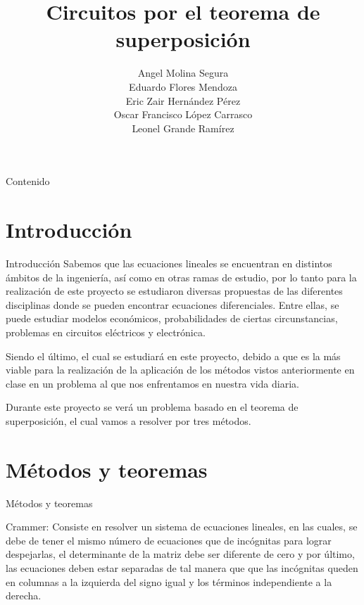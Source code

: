\documentclass[11pt]{beamer}
\author{Angel Molina Segura\\Eduardo Flores Mendoza\\ Eric Zair Hernández Pérez\\ Oscar Francisco López Carrasco\\ Leonel Grande Ramírez}
\title{Circuitos por el teorema de superposición}
\institute{
Tecnológico de Monterrey\\
Campus Puebla\\
Materia: Métodos numéricos
}
\begin{document}
    \begin{frame}
         \maketitle
    \end{frame}
    
    \begin{frame}{Contenido}
    \tableofcontents
    \end{frame}
   
    \section{Introducción}
      \begin{frame}{Introducción}
      \justifying
      Sabemos que las ecuaciones lineales se encuentran en distintos ámbitos de la ingeniería, así como en otras ramas de estudio, por lo tanto para la realización de este proyecto se estudiaron diversas propuestas de las diferentes disciplinas donde se pueden encontrar ecuaciones diferenciales. Entre ellas, se puede estudiar modelos económicos, probabilidades de ciertas circunstancias, problemas en circuitos eléctricos y electrónica.

Siendo el último, el cual se estudiará en este proyecto, debido a que es la más viable para la realización de la aplicación de los métodos vistos anteriormente en clase en un problema al que nos enfrentamos en nuestra vida diaria.

Durante este proyecto se verá un problema basado en el teorema de superposición, el cual vamos a resolver por tres métodos. 
      \end{frame}
      
    \section{Métodos y teoremas}
      \begin{frame}{Métodos y teoremas}
      

      \begin{block}{Crammer:}
\justifying 
Consiste en resolver un sistema de ecuaciones lineales, en las cuales, se debe de tener el mismo número de ecuaciones que de incógnitas para lograr despejarlas, el determinante de la matriz debe ser diferente de cero y por último, las ecuaciones deben estar separadas de tal manera que que las incógnitas queden en columnas a la izquierda del signo igual y los términos independiente a la derecha. 
\end{block}
      \end{frame}
      
\end{document}
